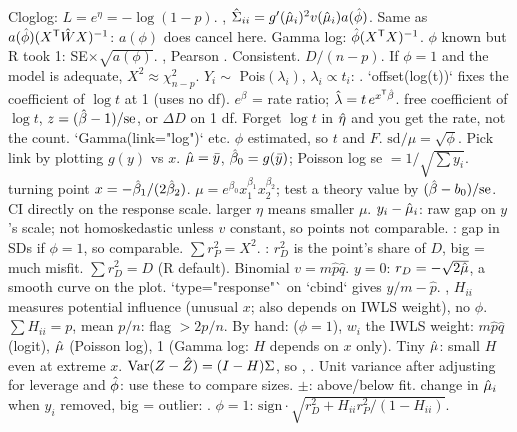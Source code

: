 Cloglog: $L=e^\eta=-\log(1-p)$.
\sk{} , $\hat\Sigma_{ii}=g'(\hat{\mu}_i)^2v(\hat{\mu}_i)a(\hat{\phi})$. Same as $a(\hat{\phi})(X^{\mathsf T}\hat WX)^{-1}$: $a(\phi)$ does  cancel here. Gamma log: $\hat{\phi}(X^{\mathsf T} X)^{-1}$. $\phi$ known but R took 1: SE$\times\sqrt{a(\phi)}$.
\sk{} , Pearson . Consistent.  $D/(n-p)$. If $\phi=1$ and the model is adequate, $X^2\approx\chi^2_{n-p}$.
\sk{} $Y_i\sim$ Pois$(\lambda_i)$, $\lambda_i\propto t_i$: . `offset(log(t))` fixes the coefficient of $\log t$ at 1 (uses no df). $e^{\beta}$ = rate ratio; $\hat\lambda=t\,e^{x^{\mathsf T}\hat{\beta}}$.  free coefficient of $\log t$, $z=(\hat{\beta}-1)/\mathrm{se}$, or $\Delta D$ on 1 df. Forget $\log t$ in $\hat{\eta}$ and you get the rate, not the count.
\sk{} `Gamma(link="log")` etc. $\phi$ estimated, so $t$ and $F$. $\mathrm{sd}/\mu=\sqrt\phi$. Pick link by plotting $g(y)$ vs $x$.
\sk{} $\hat{\mu}=\bar y$, $\hat{\beta}_0=g(\bar y)$; Poisson log se $=1/\sqrt{\sum y_i}$.  turning point $x=-\hat{\beta}_1/(2\hat{\beta}_2)$.  $\mu=e^{\beta_0}x_1^{\beta_1}x_2^{\beta_2}$; test a theory value by $(\hat{\beta}-b_0)/\mathrm{se}$.  CI directly on the response scale.  larger $\eta$ means smaller $\mu$.
\bx
{}  $y_i-\hat{\mu}_i$: raw gap on $y$'s scale; not homoskedastic unless $v$ constant, so points not comparable.  : gap in SDs if $\phi=1$, so comparable. $\sum r_P^2=X^2$.  : $r_D^2$ is the point's share of $D$, big = much misfit. $\sum r_D^2=D$ (R default). Binomial $v=m\hat p\hat q$. $y=0$: $r_D=-\sqrt{2\hat{\mu}}$, a smooth curve on the plot. `type="response"` on `cbind` gives $y/m-\hat p$.
\sk{} , $H_{ii}$ measures potential influence (unusual $x$; also depends on IWLS weight), no $\phi$. $\sum H_{ii}=p$, mean $p/n$: flag $>2p/n$. By hand:  ($\phi=1$), $w_i$ the IWLS weight: $m\hat p\hat q$ (logit), $\hat{\mu}$ (Poisson log), 1 (Gamma log: $H$ depends on $x$ only). Tiny $\hat{\mu}$: small $H$ even at extreme $x$.
\sk{} $\mathrm{Var}(Z-\hat Z)=(I-H)\Sigma$, so , . Unit variance after adjusting for leverage and $\hat{\phi}$: use these to compare sizes. $\pm$: above/below fit.
\sk{} change in $\hat{\mu}_i$ when $y_i$ removed, big = outlier: . $\phi=1$: $\mathrm{sign}\cdot\sqrt{r_D^2+H_{ii}r_P^2/(1-H_{ii})}$.
